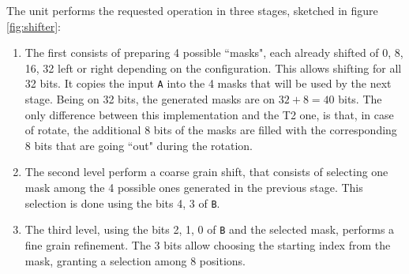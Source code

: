  The unit performs the requested operation in three stages, sketched in figure \ref{fig:shifter}:
\begin{enumerate}
    \item The first consists of preparing 4 possible ``masks", each already shifted of {0, 8, 16, 32} left or right depending on the configuration. This allows shifting for all 32 bits. It copies the input \texttt{A} into the 4 masks that will be used by the next stage. Being on 32 bits, the generated masks are on $32+8=40$ bits. The only difference between this implementation and the T2 one, is that, in case of rotate, the additional 8 bits of the masks are filled with the corresponding 8 bits that are going ``out" during the rotation.
    \item The second level perform a coarse grain shift, that consists of selecting one mask among the 4 possible ones generated in the previous stage. This selection is done using the bits {4, 3} of \texttt{B}.
    \item The third level, using the bits {2, 1, 0} of \texttt{B} and the selected mask, performs a fine grain refinement. The 3 bits allow choosing the starting index from the mask, granting a selection among 8 positions.
\end{enumerate}



